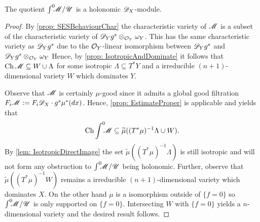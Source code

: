 \begin{lemma}
  The quotient $\int^0 \mkern -8mu\mathscr{M} / \mathscr{U}$ is a holonomic $\mathscr{D}_X$-module.
\end{lemma}
\begin{proof}
  By \cref{prop: SESBehaviourChar} the characteristic variety of $\mathscr{M}$ is a subset of the characteristic variety of $\mathscr{D}_Yg^s \otimes_{\mathcal{O}_Y} \omega_Y$.
  This has the same characteristic variety as $\mathscr{D}_Y g^s$ due to the $\mathcal{O}_Y$-linear isomorphism between $\mathscr{D}_Yg^s$ and $\mathscr{D}_Yg^s \otimes_{\mathcal{O}_Y} \omega_Y$
  Hence, by \cref{prop: IsotropicAndDominate} it follows that $\operatorname{Ch} \mathscr{M} \subseteq W \cup \Lambda$ for some isotropic $\Lambda\subseteq T^*Y$ and a irreducible $(n+1)$-dimensional variety $W$ which dominates $Y$.

  Observe that $\mathscr{M}$ is certainly $\mu$-good since it admits a global good filtration $F_i\mathscr{M} := F_i\mathscr{D}_X \cdot g^s \mu^*(dx)$.
  Hence, \cref{prop: EstimateProper} is applicable and yields that
  $$\operatorname{Ch} \int^0 \mkern -8mu \mathscr{M} \subseteq \widetilde{\mu}((T^*\mu)^{-1} \Lambda \cup W).$$
  By \cref{lem: IsotropicDirectImage} the set $\widetilde{\mu}((T^*\mu)^{-1}\Lambda)$ is still isotropic and will not form any obstruction to $\int^0 \mkern -8mu\mathscr{M}/\mathscr{U}$ being holonomic.
  Further, observe that $\widetilde{\mu}((T^*\mu)^{-1}W)$ remains a irreducible $(n+1)$-dimensional variety which dominates $X$.
  On the other hand $\mu$ is a isomorphism outside of $\{f = 0\}$ so $\int^0 \mkern -8mu\mathscr{M}/\mathscr{U}$ is only supported on $\{f = 0\}$.
  Intersecting $W$ with $\{f = 0\}$ yields a $n$-dimensional variety and the desired result follows.
\end{proof}

